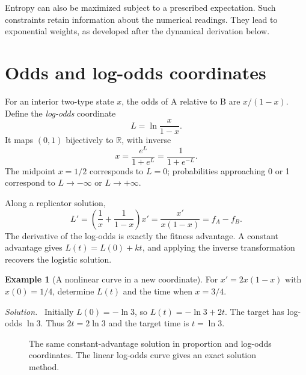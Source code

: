 \documentclass[11pt,oneside,openany]{book}
\theoremstyle{definition}
\newtheorem{example}{Example}[chapter]
\theoremstyle{remark}
\newenvironment{solution}{\par\smallskip\noindent\textit{Solution.}\ }{\par\smallskip}
\newcommand{\R}{\mathbb{R}}
\numberwithin{equation}{chapter}
\begin{document}
Entropy can also be maximized subject to a prescribed expectation. Such constraints retain information about the numerical readings. They lead to exponential weights, as developed after the dynamical derivation below.

\section{Odds and log-odds coordinates}
For an interior two-type state $x$, the odds of A relative to B are $x/(1-x)$. Define the \emph{log-odds} coordinate
\[
L=\ln\frac{x}{1-x}.
\]
It maps $(0,1)$ bijectively to $\R$, with inverse
\[
x=\frac{e^L}{1+e^L}=\frac1{1+e^{-L}}.
\]
The midpoint $x=1/2$ corresponds to $L=0$; probabilities approaching 0 or 1 correspond to $L\to-\infty$ or $L\to+\infty$.

Along a replicator solution,
\begin{equation}\label{eq:logoddsevolution}
L'=\left(\frac1x+\frac1{1-x}\right)x'
=\frac{x'}{x(1-x)}=f_A-f_B.
\end{equation}
The derivative of the log-odds is exactly the fitness advantage. A constant advantage gives $L(t)=L(0)+kt$, and applying the inverse transformation recovers the logistic solution.

\begin{example}[A nonlinear curve in a new coordinate]
For $x'=2x(1-x)$ with $x(0)=1/4$, determine $L(t)$ and the time when $x=3/4$.
\begin{solution}
Initially $L(0)=-\ln3$, so $L(t)=-\ln3+2t$. The target has log-odds $\ln3$. Thus $2t=2\ln3$ and the target time is $t=\ln3$.
\end{solution}
\end{example}

\begin{figure}[htbp]
\centering
{}
\caption{The same constant-advantage solution in proportion and log-odds coordinates. The linear log-odds curve gives an exact solution method.}
\end{figure}
\end{document}
